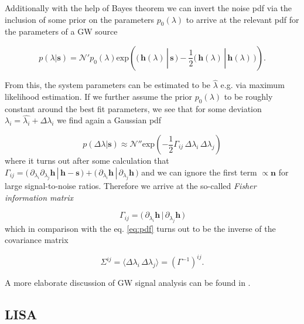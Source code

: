 \documentclass{aa}
\begin{document}
Additionally with the help of Bayes theorem we can invert the noise pdf via the inclusion of some prior on the parameters $p_0(\lambda)$ to arrive at the relevant pdf for the parameters of a GW source

\begin{equation}
    p(\lambda|\mathbf{s})=\mathcal{N}' p_0(\lambda) \mathrm{exp}\left(\big(\, \mathbf{h}(\lambda)\,|\,\mathbf{s}\,\big)-\frac{1}{2}\big(\, \mathbf{h}(\lambda)\,|\,\mathbf{h}(\lambda)\,\big)\right).
\end{equation}    

From this, the system parameters can be estimated to be $\hat{\lambda}$ e.g. via maximum likelihood estimation. If we further assume the prior $p_0(\lambda)$ to be roughly constant around the best fit parameters, we see that for some deviation $\lambda_i=\hat{\lambda_i}+\Delta \lambda_i$ we find again a Gaussian pdf

\begin{equation} \label{eq:pdf}
    p(\Delta \lambda|\mathbf{s})\approx\mathcal{N}'' \mathrm{exp}\left( - \frac{1}{2} \Gamma_{ij} \, \Delta \lambda_i \, \Delta \lambda_j \right)
\end{equation}    
where it turns out after some calculation that $\Gamma_{ij}=\big(\, \partial_{\lambda_i} \partial_{\lambda_j}\mathbf{h}\,|\,\mathbf{h}-\mathbf{s}\,\big) + \big(\, \partial_{\lambda_i} \mathbf{h}\,|\,\partial_{\lambda_j}\mathbf{h}\,\big)$ and we can ignore the first term $\propto \mathbf{n}$ for large signal-to-noise ratios. Therefore we arrive at the so-called \textit{Fisher information matrix}

\begin{equation}
    \Gamma_{ij}= \big(\, \partial_{\lambda_i} \mathbf{h}\,|\,\partial_{\lambda_j}\mathbf{h}\,\big)
\end{equation}    
which in comparison with the eq. \ref{eq:pdf} turns out to be the inverse of the covariance matrix

\begin{equation}
    \Sigma^{ij}=\langle \Delta \lambda_i \, \Delta \lambda_j \rangle = \left(\Gamma^{-1} \right)^{ij}.
\end{equation}    

A more elaborate discussion of GW signal analysis can be found in \citep{maggiore}.

\subsection{LISA}
\label{sec:LISA}
\end{document}
